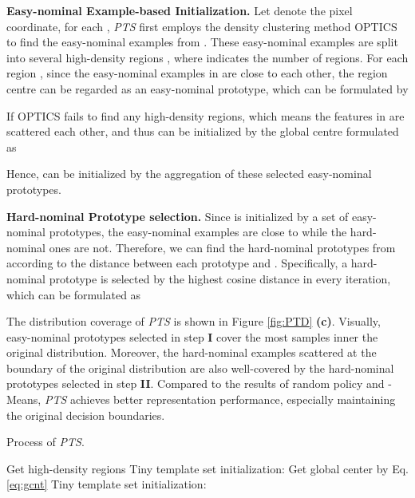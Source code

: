 \documentclass[default,iicol]{sn-jnl}\usepackage[algo2e,ruled,linesnumbered]{algorithm2e}
\theoremstyle{thmstyleone}\newtheorem{theorem}{Theorem}\newtheorem{proposition}[theorem]{Proposition}
\theoremstyle{thmstyletwo}\newtheorem{example}{Example}\newtheorem{remark}{Remark}
\theoremstyle{thmstylethree}\newtheorem{definition}{Definition}
\begin{document}
\noindent\textbf{Easy-nominal Example-based Initialization. }
Let  denote the pixel coordinate, for each , \textit{PTS} first employs the density clustering method OPTICS \cite{OPTICS} to find the easy-nominal examples from .
These easy-nominal examples are split into several high-density regions , where  indicates the number of regions.
For each region , since the easy-nominal examples in  are close to each other, the region centre  can be regarded as an easy-nominal prototype, which can be formulated by

If OPTICS fails to find any high-density regions, which means the features in  are scattered each other, and thus  can be initialized by the global centre  formulated as

Hence,  can be initialized by the aggregation of these selected easy-nominal prototypes.


\noindent\textbf{Hard-nominal Prototype selection. }
Since  is initialized by a set of easy-nominal prototypes, the easy-nominal examples are close to  while the hard-nominal ones are not.
Therefore, we can find the hard-nominal prototypes from  according to the distance between each prototype and .
Specifically, a hard-nominal prototype  is selected by the highest cosine distance in every iteration, which can be formulated as


The distribution coverage of \textit{PTS} is shown in Figure \ref{fig:PTD} \textbf{(c)}.
Visually, easy-nominal prototypes selected in step \textbf{I} cover the most samples inner the original distribution.
Moreover, the hard-nominal examples scattered at the boundary of the original distribution are also well-covered by the hard-nominal prototypes selected in step \textbf{II}.
Compared to the results of random policy and -Means, \textit{PTS} achieves better representation performance, especially maintaining the original decision boundaries.

\begin{algorithm2e}[!t]
    \footnotesize
\caption{Process of \textit{PTS}.}
    \label{alg:PTS}
    Get high-density regions \;
    \eIf{} {
        Tiny template set initialization: \;
    }   {
        Get global center  by Eq. \ref{eq:gcnt}\;
        Tiny template set initialization: \;
    }
\end{algorithm2e}
\end{document}
